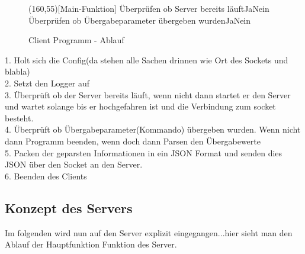 \begin{figure}[H]
    \begin{struktogramm}(160,55)[Main-Funktion] 
         {Überprüfen ob Server bereits läuft}{Ja}{Nein} 
        	\change
        \ifend
         {Überprüfen ob Übergabeparameter übergeben wurden}{Ja}{Nein} 
            \change
        \ifend
    \end{struktogramm} 
\caption{Client Programm - Ablauf} 
\label{lst:client_ablauf} 
\end{figure}

1. Holt sich die Config(da stehen alle Sachen drinnen wie Ort des Sockets und blabla)\\
2. Setzt den Logger auf \\
3. Überprüft ob der Server bereits läuft, wenn nicht dann startet er den Server und wartet solange bis er hochgefahren ist und die Verbindung zum socket besteht. \\
4. Überprüft ob Übergabeparameter(Kommando) übergeben wurden. Wenn nicht dann Programm beenden, wenn doch dann Parsen den Übergabewerte \\
5. Packen der geparsten Informationen in ein JSON Format und senden dies JSON über den Socket an den Server. \\
6. Beenden des Clients \\

\subsection{Konzept des Servers}

Im folgenden wird nun auf den Server explizit eingegangen...hier sieht man den Ablauf der Hauptfunktion Funktion des Server.

